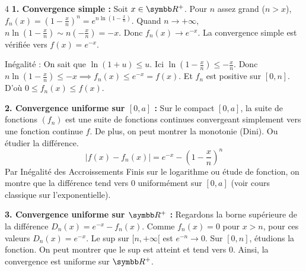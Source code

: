 \begin{correction}{4}
\textbf{1. Convergence simple :}
Soit $x \in \R^+$. Pour $n$ assez grand ($n>x$), $f_n(x) = (1-\frac{x}{n})^n = e^{n \ln(1-\frac{x}{n})}$.
Quand $n \to +\infty$, $n \ln(1-\frac{x}{n}) \sim n(-\frac{x}{n}) = -x$.
Donc $f_n(x) \to e^{-x}$. La convergence simple est vérifiée vers $f(x) = e^{-x}$.

Inégalité : On sait que $\ln(1+u) \le u$. Ici $\ln(1-\frac{x}{n}) \le -\frac{x}{n}$.
Donc $n \ln(1-\frac{x}{n}) \le -x \implies f_n(x) \le e^{-x} = f(x)$.
Et $f_n$ est positive sur $[0, n]$. D'où $0 \le f_n(x) \le f(x)$.

\textbf{2. Convergence uniforme sur $[0, a]$ :}
Sur le compact $[0, a]$, la suite de fonctions $(f_n)$ est une suite de fonctions continues convergeant simplement vers une fonction continue $f$.
De plus, on peut montrer la monotonie (Dini). Ou étudier la différence.
$$ |f(x) - f_n(x)| = e^{-x} - (1-\frac{x}{n})^n $$
Par Inégalité des Accroissements Finis sur le logarithme ou étude de fonction, on montre que la différence tend vers 0 uniformément sur $[0, a]$ (voir cours classique sur l'exponentielle).

\textbf{3. Convergence uniforme sur $\R^+$ :}
Regardons la borne supérieure de la différence $D_n(x) = e^{-x} - f_n(x)$.
Comme $f_n(x) = 0$ pour $x > n$, pour ces valeurs $D_n(x) = e^{-x}$.
Le sup sur $[n, +\infty[$ est $e^{-n} \to 0$.
Sur $[0, n]$, étudions la fonction. On peut montrer que le sup est atteint et tend vers 0.
Ainsi, la convergence est uniforme sur $\R^+$.
\end{correction}


